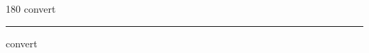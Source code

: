 
\begin{frame}
\begin{center}
\begin{turn}{180}
{\fontsize{2.5cm}{1em}\selectfont convert}
\end{turn}
\vspace{1em}\par  
\hrule
\vspace{1em}\par  
{\fontsize{2.5cm}{1em}\selectfont convert}
\end{center}
\end{frame}
